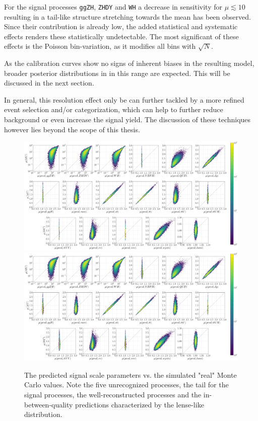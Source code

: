For the signal processes \texttt{ggZH}, \texttt{ZHDY} and \texttt{WH} a decrease in sensitivity for $\mu\lesssim10$ resulting in a tail-like structure stretching towards the mean has been observed. Since their contribution is already low, the added statistical and systematic effects renders these statistically undetectable. The most significant of these effects is the Poisson bin-variation, as it modifies all bins with $\sqrt{N}$.

As the calibration curves show no signs of inherent biases in the resulting model, broader posterior distributions in in this range are expected. This will be discussed in the next section.

In general, this resolution effect only be can further tackled by a more refined event selection and/or categorization, which can help to further reduce background or even increase the signal yield. The discussion of these techniques however lies beyond the scope of this thesis.

\begin{figure}[h!]
	\centering
	\includegraphics[width=\linewidth]{figures/inference/p}
	\includegraphics[width=\linewidth]{figures/inference/p_SN}
	\caption{The predicted signal scale parameters vs. the simulated "real" Monte Carlo values. Note the five unrecognized processes, the tail for the signal processes, the well-reconstructed processes and the in-between-quality predictions characterized by the lense-like distribution.}
	\label{fig:predictions}
\end{figure}

